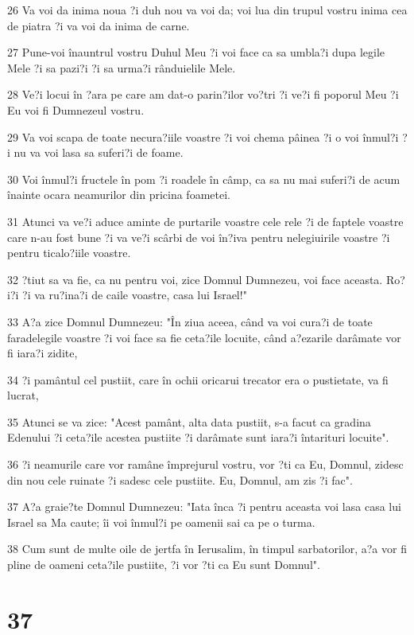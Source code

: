 \par 26 Va voi da inima noua ?i duh nou va voi da; voi lua din trupul vostru inima cea de piatra ?i va voi da inima de carne.
\par 27 Pune-voi înauntrul vostru Duhul Meu ?i voi face ca sa umbla?i dupa legile Mele ?i sa pazi?i ?i sa urma?i rânduielile Mele.
\par 28 Ve?i locui în ?ara pe care am dat-o parin?ilor vo?tri ?i ve?i fi poporul Meu ?i Eu voi fi Dumnezeul vostru.
\par 29 Va voi scapa de toate necura?iile voastre ?i voi chema pâinea ?i o voi înmul?i ?i nu va voi lasa sa suferi?i de foame.
\par 30 Voi înmul?i fructele în pom ?i roadele în câmp, ca sa nu mai suferi?i de acum înainte ocara neamurilor din pricina foametei.
\par 31 Atunci va ve?i aduce aminte de purtarile voastre cele rele ?i de faptele voastre care n-au fost bune ?i va ve?i scârbi de voi în?iva pentru nelegiuirile voastre ?i pentru ticalo?iile voastre.
\par 32 ?tiut sa va fie, ca nu pentru voi, zice Domnul Dumnezeu, voi face aceasta. Ro?i?i ?i va ru?ina?i de caile voastre, casa lui Israel!"
\par 33 A?a zice Domnul Dumnezeu: "În ziua aceea, când va voi cura?i de toate faradelegile voastre ?i voi face sa fie ceta?ile locuite, când a?ezarile darâmate vor fi iara?i zidite,
\par 34 ?i pamântul cel pustiit, care în ochii oricarui trecator era o pustietate, va fi lucrat,
\par 35 Atunci se va zice: "Acest pamânt, alta data pustiit, s-a facut ca gradina Edenului ?i ceta?ile acestea pustiite ?i darâmate sunt iara?i întarituri locuite".
\par 36 ?i neamurile care vor ramâne împrejurul vostru, vor ?ti ca Eu, Domnul, zidesc din nou cele ruinate ?i sadesc cele pustiite. Eu, Domnul, am zis ?i fac".
\par 37 A?a graie?te Domnul Dumnezeu: "Iata înca ?i pentru aceasta voi lasa casa lui Israel sa Ma caute; îi voi înmul?i pe oamenii sai ca pe o turma.
\par 38 Cum sunt de multe oile de jertfa în Ierusalim, în timpul sarbatorilor, a?a vor fi pline de oameni ceta?ile pustiite, ?i vor ?ti ca Eu sunt Domnul".

\chapter{37}

